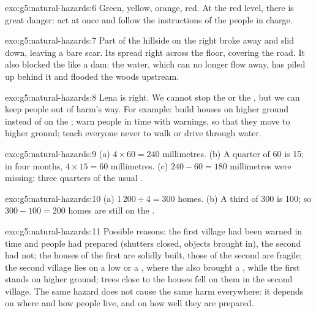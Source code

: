 \begin{solution}{exo:g5:natural-hazards:6}
Green, yellow, orange, red. At the red level, there is great danger: act at
once and follow the instructions of the people in charge.
\end{solution}

\begin{solution}{exo:g5:natural-hazards:7}
Part of the hillside on the right broke away and slid down, leaving a bare
scar. Its  spread right across the  floor, covering the road. It
also blocked the  like a dam: the  water, which can no longer
flow away, has piled up behind it and flooded the woods upstream.
\end{solution}

\begin{solution}{exo:g5:natural-hazards:8}
Lena is right. We cannot stop the  or the , but we can keep people
out of harm's way. For example: build houses on higher ground instead of on
the ; warn people in time with  warnings, so that they move
to higher ground; teach everyone never to walk or drive through 
water.
\end{solution}

\begin{solution}{exo:g5:natural-hazards:9}
(a) $4 \times 60 = 240$ millimetres. (b) A quarter of 60 is 15; in four
months, $4 \times 15 = 60$ millimetres. (c) $240 - 60 = 180$ millimetres
were missing: three quarters of the usual .
\end{solution}

\begin{solution}{exo:g5:natural-hazards:10}
(a) $1\,200 \div 4 = 300$ homes. (b) A third of 300 is 100; so
$300 - 100 = 200$ homes are still on the .
\end{solution}

\begin{solution}{exo:g5:natural-hazards:11}
Possible reasons: the first village had been warned in time and people had
prepared (shutters closed, objects brought in), the second had not; the
houses of the first are solidly built, those of the second are fragile; the
second village lies on a low  or a , where the  also
brought a , while the first stands on higher ground; trees close to the
houses fell on them in the second village. The same hazard does not cause
the same harm everywhere: it depends on where and how people live, and on
how well they are prepared.
\end{solution}
